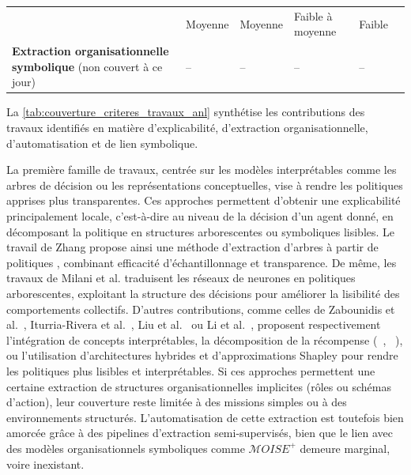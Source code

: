 \begin{table}[h!]
\begin{tabular}{p{4cm}p{1.7cm}p{2.3cm}p{1.7cm}p{1.7cm}p{1.7cm}}
        \cite{berenji2000learning, yusuf2020inferential, serrino2019finding, Wang2020, subramanian2024neurosymbolic}
                                    & Moyenne
                                    & Moyenne
                                    & Faible à moyenne
                                    & Faible                                                                                                              \\
        \textbf{Extraction organisationnelle symbolique} \newline
        (non couvert à ce jour)
                                    & --
                                    & --
                                    & --
                                    & --                                                                                                                  \\
        \hline
    \end{tabular}
\end{table}

La \autoref{tab:couverture_criteres_travaux_anl} synthétise les contributions des travaux identifiés en matière d'explicabilité, d'extraction organisationnelle, d'automatisation et de lien symbolique.

La première famille de travaux, centrée sur les modèles interprétables comme les arbres de décision ou les représentations conceptuelles, vise à rendre les politiques apprises plus transparentes. Ces approches permettent d’obtenir une explicabilité principalement locale, c’est-à-dire au niveau de la décision d’un agent donné, en décomposant la politique en structures arborescentes ou symboliques lisibles. Le travail de Zhang \cite{zhang2024advancing} propose ainsi une méthode d'extraction d’arbres à partir de politiques , combinant efficacité d’échantillonnage et transparence. De même, les travaux  de Milani et al. \cite{milani2022maviper,milani2024interpretable} traduisent les réseaux de neurones en politiques arborescentes, exploitant la structure des décisions pour améliorer la lisibilité des comportements collectifs. D'autres contributions, comme celles de Zabounidis et al.~\cite{zabounidis2023concept}, Iturria-Rivera et al.~\cite{iturria2024explainable}, Liu et al.~\cite{liu2025} ou Li et al.~\cite{li2025from}, proposent respectivement l'intégration de concepts interprétables, la décomposition de la récompense (~\cite{Sunehag2018}, ~\cite{Tabish2018}), ou l'utilisation d'architectures hybrides et d'approximations Shapley pour rendre les politiques plus lisibles et interprétables. Si ces approches permettent une certaine extraction de structures organisationnelles implicites (rôles ou schémas d’action), leur couverture reste limitée à des missions simples ou à des environnements structurés. L’automatisation de cette extraction est toutefois bien amorcée grâce à des pipelines d’extraction semi-supervisés, bien que le lien avec des modèles organisationnels symboliques comme $\mathcal{M}OISE^+$ demeure marginal, voire inexistant.

